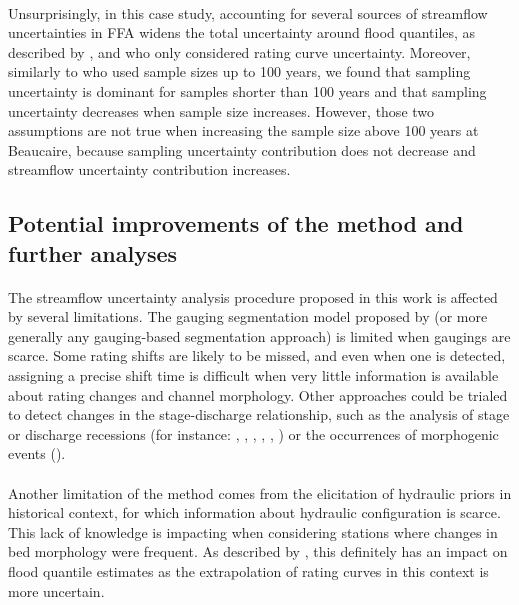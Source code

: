 \documentclass[11pt]{article}
\begin{document}
    \paragraph{}
    Unsurprisingly, in this case study, accounting for several sources of streamflow uncertainties in FFA widens the total uncertainty around flood quantiles, as described by \citet{petersen-overleir_accounting_2009}, \citet{steinbakk_propagation_2016} and \citet{vieira_assessing_2022} who only considered rating curve uncertainty. Moreover, similarly to \citet{steinbakk_propagation_2016} who used sample sizes up to 100 years, we found that sampling uncertainty is dominant for samples shorter than 100 years and that sampling uncertainty decreases when sample size increases. However, those two assumptions are not true when increasing the sample size above 100 years at Beaucaire, because sampling uncertainty contribution does not decrease and streamflow uncertainty contribution increases. 
    
    \subsection{Potential improvements of the method and further analyses}
    \paragraph{}
    The streamflow uncertainty analysis procedure proposed in this work is affected by several limitations. The gauging segmentation model proposed by \citet{darienzo_detection_2021} (or more generally any gauging-based segmentation approach) is limited when gaugings are scarce. Some rating shifts are likely to be missed, and even when one is detected, assigning a precise shift time is difficult when very little information is available about rating changes and channel morphology. Other approaches could be trialed to detect changes in the stage-discharge relationship, such as the analysis of stage or discharge recessions (for instance: \citet{nathan_evaluation_1990}, \citet{tallaksen_review_1995}, \citet{vogel_estimation_1996}, \citet{chapman_comparison_1999}, \citet{lang_extrapolation_2010}, \citet{darienzo_detection_2021-1}) or the occurrences of morphogenic events (\citet{darienzo_detection_2021-1}).    
    \paragraph{}
    Another limitation of the method comes from the elicitation of hydraulic priors in historical context, for which information about hydraulic configuration is scarce. This lack of knowledge is impacting when considering stations where changes in bed morphology were frequent. As described by \citet{petersen-overleir_accounting_2009}, this definitely has an impact on flood quantile estimates as the extrapolation of rating curves in this context is more uncertain. 
\end{document}
